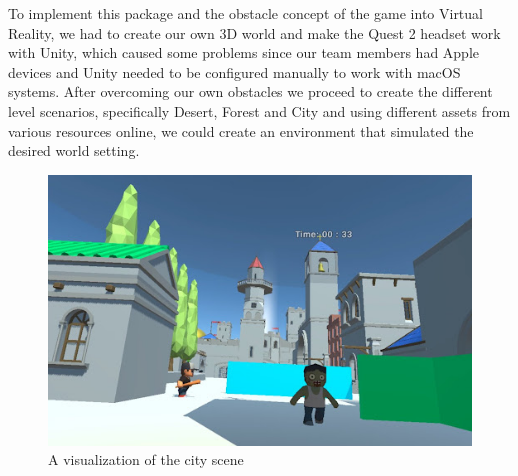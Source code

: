\documentclass{vgtc}                          %
\begin{document}
To implement this package and the obstacle concept of the game into Virtual Reality, we had to create our own 3D world and make the Quest 2 headset work with Unity, which caused some problems since our team members had Apple devices and Unity needed to be configured manually to work with macOS systems. After overcoming our own obstacles we proceed to create the different level scenarios, specifically Desert, Forest and City and using different assets from various resources online, we could create an environment that simulated the desired world setting.
\begin{figure}[tb]
  \centering %
  \includegraphics[width=\columnwidth]{city1.jpg}
  \caption{A visualization of the city scene}
 \end{figure}
\end{document}
